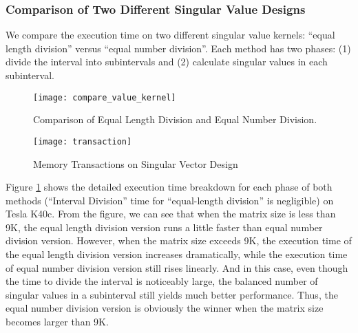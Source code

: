 \subsubsection{Comparison of Two Different Singular Value Designs}
We compare the execution time on two different singular value kernels:
``equal length division'' versus ``equal number division''. Each
method has two phases: (1) divide the interval into subintervals and
(2) calculate singular values in each subinterval.
\begin{figure}[t]
\vspace{-0.15in}
\centering
\texttt{[image: compare\_value\_kernel]}
\vspace{-0.1in}
\caption{Comparison of Equal Length Division and Equal Number Division.}
\label{fig:compare_value_kernel}
\vspace{-0.3in}
\end{figure}
\begin{figure}[hbpt]
\centering
\texttt{[image: transaction]}
\vspace{-0.1in}
\caption{Memory Transactions on Singular Vector Design}
\label{fig:transaction}
\vspace{-0.1in}
\end{figure}
Figure \ref{fig:compare_value_kernel} shows the detailed execution time breakdown for each phase of both methods (``Interval Division'' time for ``equal-length division'' is negligible) on Tesla K40c.
From the figure, we can see that when the matrix size is less than 9K, the equal length division version runs a little faster than equal number division version.
However, when the matrix size exceeds 9K, the execution time of the equal length division version increases dramatically, while the execution time of equal number division version still rises linearly.
And in this case, 
even though the time to divide the interval is noticeably
large, the balanced number of singular values in a subinterval
still yields much better performance.
Thus, the equal number division version is obviously the winner when the matrix size becomes larger than 9K.

